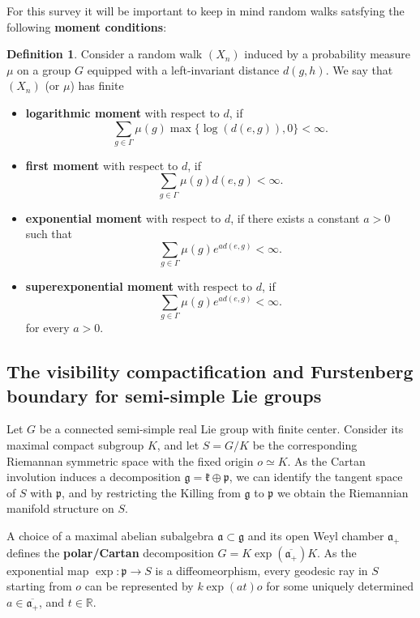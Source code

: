 \documentclass[11pt]{amsart}
\theoremstyle{definition}
\newtheorem{definition}{Definition}[section]
\begin{document}
			For this survey it will be important to keep in mind random walks satsfying the following \textbf{moment conditions}:
			\begin{definition}
				Consider a random walk $(X_n)$ induced by a probability measure $\mu$ on a group $G$ equipped with a left-invariant distance $d(g, h)$. We say that $(X_n)$ (or $\mu$) has finite
				\begin{itemize}
					\item \textbf{logarithmic moment} with respect to $d$, if
					\[
					\sum_{g \in \Gamma} \mu(g) \max \{ \log(d(e, g)), 0 \} < \infty.
					\]
					\item \textbf{first moment} with respect to $d$, if
					\[
					\sum_{g \in \Gamma} \mu(g) d(e, g) < \infty.
					\]
					\item \textbf{exponential moment} with respect to $d$, if there exists a constant $a > 0$ such that
					\[
					\sum_{g \in \Gamma} \mu(g) e^{a d(e, g)} < \infty.
					\]
					\item \textbf{superexponential moment} with respect to $d$, if
					\[
					\sum_{g \in \Gamma} \mu(g) e^{a d(e, g)} < \infty.
					\]
					for every $a > 0$.
				\end{itemize}
			\end{definition}
			
		\subsection{The visibility compactification and Furstenberg boundary for semi-simple Lie groups}
		Let $G$ be a connected semi-simple real Lie group with finite center. Consider its maximal compact subgroup $K$, and let $S = G / K$ be the corresponding Riemannan symmetric space with the fixed origin $o \simeq K$. As the Cartan involution induces a decomposition $\mathfrak{g} = \mathfrak{k} \oplus \mathfrak{p}$, we can identify the tangent space of $S$ with $\mathfrak{p}$, and by restricting the Killing from $\mathfrak{g}$ to $\mathfrak{p}$ we obtain the Riemannian manifold structure on $S$.
		
		A choice of a maximal abelian subalgebra $\mathfrak{a} \subset \mathfrak{g}$ and its open Weyl chamber $\mathfrak{a}_+$ defines the \textbf{polar/Cartan} decomposition $G = K\exp(\overline{\mathfrak{a}_+}) K$. As the exponential map $\exp : \mathfrak{p} \rightarrow S$ is a diffeomeorphism, every geodesic ray in $S$ starting from $o$ can be represented by $k \exp(a t) o$ for some uniquely determined $a \in \overline{\mathfrak{a}_+}$, and $t \in \mathbb{R}$. 
		
\end{document}
